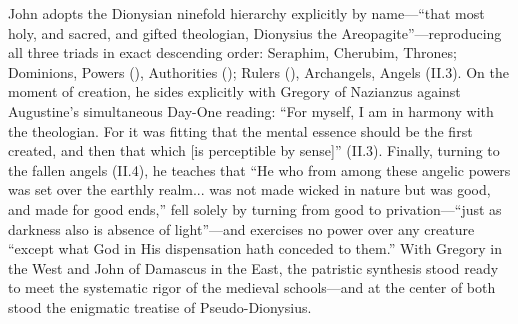 John adopts the Dionysian ninefold hierarchy explicitly by name---``that most holy, and sacred, and gifted theologian, Dionysius the Areopagite''---reproducing all three triads in exact descending order: Seraphim, Cherubim, Thrones; Dominions, Powers (), Authorities (); Rulers (), Archangels, Angels (II.3). On the moment of creation, he sides explicitly with Gregory of Nazianzus against Augustine's simultaneous Day-One reading: ``For myself, I am in harmony with the theologian. For it was fitting that the mental essence should be the first created, and then that which [is perceptible by sense]'' (II.3). Finally, turning to the fallen angels (II.4), he teaches that ``He who from among these angelic powers was set over the earthly realm... was not made wicked in nature but was good, and made for good ends,'' fell solely by turning from good to privation---``just as darkness also is absence of light''---and exercises no power over any creature ``except what God in His dispensation hath conceded to them.'' With Gregory in the West and John of Damascus in the East, the patristic synthesis stood ready to meet the systematic rigor of the medieval schools---and at the center of both stood the enigmatic treatise of Pseudo-Dionysius.
